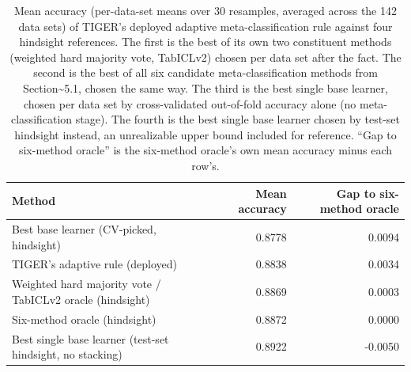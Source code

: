 \begin{table}[t]
\centering
\begin{tabular}{lrr}
\toprule
Method & Mean accuracy & Gap to six-method oracle \\
\midrule
Best base learner (CV-picked, hindsight) & 0.8778 & 0.0094 \\
TIGER's adaptive rule (deployed) & 0.8838 & 0.0034 \\
Weighted hard majority vote / TabICLv2 oracle (hindsight) & 0.8869 & 0.0003 \\
Six-method oracle (hindsight) & 0.8872 & 0.0000 \\
Best single base learner (test-set hindsight, no stacking) & 0.8922 & -0.0050 \\
\bottomrule
\end{tabular}
\caption{Mean accuracy (per-data-set means over 30 resamples, averaged across the 142 data sets) of TIGER's deployed adaptive meta-classification rule against four hindsight references. The first is the best of its own two constituent methods (weighted hard majority vote, TabICLv2) chosen per data set after the fact. The second is the best of all six candidate meta-classification methods from Section\textasciitilde{}5.1, chosen the same way. The third is the best single base learner, chosen per data set by cross-validated out-of-fold accuracy alone (no meta-classification stage). The fourth is the best single base learner chosen by test-set hindsight instead, an unrealizable upper bound included for reference. ``Gap to six-method oracle'' is the six-method oracle's own mean accuracy minus each row's.}
\label{tab:oracle-headroom}
\end{table}